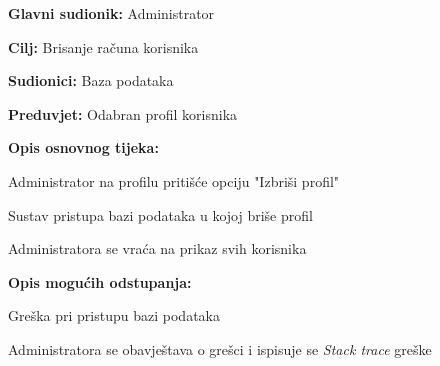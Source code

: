					\noindent {}
					\begin{packed_item}
						
						\item \textbf{Glavni sudionik: }Administrator
						\item  \textbf{Cilj:} Brisanje računa korisnika
						\item  \textbf{Sudionici:} Baza podataka
						\item  \textbf{Preduvjet:} Odabran profil korisnika
						\item  \textbf{Opis osnovnog tijeka:}
						
						\item[] \begin{packed_enum}
							\item Administrator na profilu pritišće opciju "Izbriši profil"
							\item Sustav pristupa bazi podataka u kojoj briše profil
							\item Administratora se vraća na prikaz svih korisnika
						\end{packed_enum}
						\item \textbf{Opis mogućih odstupanja:}
						\item[] \begin{packed_item}
							
							\item[2.a] Greška pri pristupu bazi podataka
							\item[] \begin{packed_enum}
								
								\item Administratora se obavještava o grešci i ispisuje se \textit{Stack trace} greške
								
							\end{packed_enum}
						\end{packed_item}
					\end{packed_item}
					
